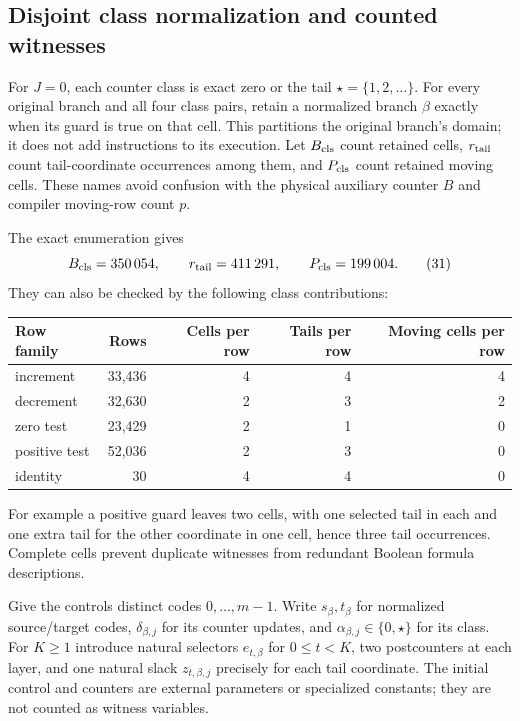 \documentclass[11pt,a4paper]{article}
\numberwithin{equation}{section}
\begin{document}
\subsection{Disjoint class normalization and counted witnesses}
For $J=0$, each counter class is exact zero or the tail $\star=\{1,2,\ldots\}$.
For every original branch and all four class pairs, retain a normalized
branch $\beta$ exactly when its guard is true on that cell. This partitions
the original branch's domain; it does not add instructions to its execution.
Let $B_{\rm cls}$ count retained cells, $r_{\rm tail}$ count tail-coordinate
occurrences among them, and $P_{\rm cls}$ count retained moving cells. These
names avoid confusion with the physical auxiliary counter $B$ and compiler
moving-row count $p$.

The exact enumeration gives
\[
 B_{\rm cls}=350\,054,\qquad r_{\rm tail}=411\,291,
 \qquad P_{\rm cls}=199\,004.                           \tag{31}
\]
They can also be checked by the following class contributions:
\begin{center}
\begin{tabular}{lrrrr}\toprule
Row family & Rows & Cells per row & Tails per row & Moving cells per row\\\midrule
increment & 33,436 & 4 & 4 & 4\\
decrement & 32,630 & 2 & 3 & 2\\
zero test & 23,429 & 2 & 1 & 0\\
positive test & 52,036 & 2 & 3 & 0\\
identity & 30 & 4 & 4 & 0\\\bottomrule
\end{tabular}
\end{center}
For example a positive guard leaves two cells, with one selected tail in
each and one extra tail for the other coordinate in one cell, hence three
tail occurrences. Complete cells prevent duplicate witnesses from redundant
Boolean formula descriptions.

Give the controls distinct codes $0,\ldots,m-1$. Write $s_\beta,t_\beta$
for normalized source/target codes, $\delta_{\beta,j}$ for its counter updates,
and $\alpha_{\beta,j}\in\{0,\star\}$ for its class. For $K\ge1$ introduce
natural selectors $e_{t,\beta}$ for $0\le t<K$, two postcounters at each
layer, and one natural slack $z_{t,\beta,j}$ precisely for each tail
coordinate. The initial control and counters are external parameters or
specialized constants; they are not counted as witness variables.
\end{document}

